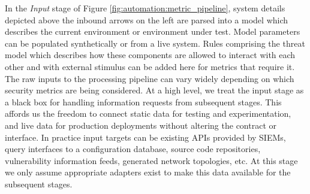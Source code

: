 


In the \textit{Input} stage of Figure \ref{fig:automation:metric_pipeline}, system details depicted above the inbound arrows on the left are parsed into a model which describes the current environment or environment under test. Model parameters can be populated synthetically or from a live system. Rules comprising the threat model which describes how these components are allowed to interact with each other and with external stimulus can be added here for metrics that require it. The raw inputs to the processing pipeline can vary widely depending on which security metrics are being considered. At a high level, we treat the input stage as a black box for handling information requests from subsequent stages. This affords us the freedom to connect static data for testing and experimentation, and live data for production deployments without altering the contract or interface. In practice input targets can be existing APIs provided by SIEMs, query interfaces to a configuration database, source code repositories, vulnerability information feeds, generated network topologies, etc. At this stage we only assume appropriate adapters exist to make this data available for the subsequent stages.
